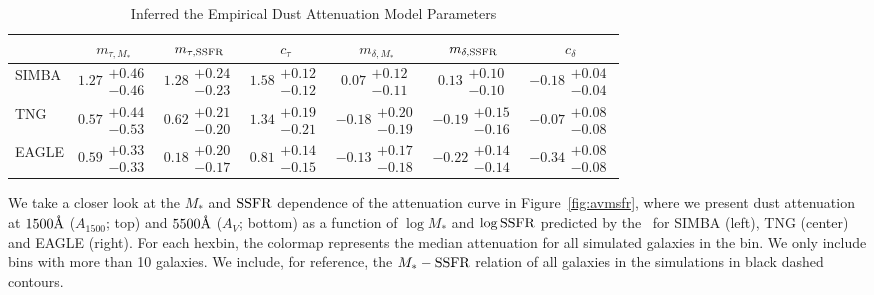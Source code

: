 \begin{table}
    \caption{Inferred the Empirical Dust Attenuation Model Parameters}
    \begin{tabular}{lcccccc} \toprule
        & $m_{\tau,M_*}$ & $m_{\tau,{\rm SSFR}}$ & $c_\tau$ & $m_{\delta,M_*}$ & $m_{\delta,{\rm SSFR}}$ & $c_\delta$ \\[3pt] \hline\hline
        SIMBA   & $1.27\substack{+0.46\\-0.46}$ &
        $1.28\substack{+0.24\\-0.23}$ & $1.58\substack{+0.12\\-0.12}$ &
        $0.07 \substack{+0.12\\-0.11}$ & $0.13 \substack{+0.10\\-0.10}$ &
        $-0.18\substack{+0.04\\-0.04}$ \\
        TNG     & $0.57\substack{+0.44\\-0.53}$ &
        $0.62\substack{+0.21\\-0.20}$ & $1.34\substack{+0.19\\-0.21}$ &
        $-0.18\substack{+0.20\\-0.19}$ & $-0.19\substack{+0.15\\-0.16}$ &
        $-0.07\substack{+0.08\\-0.08}$ \\
        EAGLE   & $0.59\substack{+0.33\\-0.33}$ &
        $0.18\substack{+0.20\\-0.17}$ & $0.81\substack{+0.14\\-0.15}$ &
        $-0.13\substack{+0.17\\-0.18}$ & $-0.22\substack{+0.14\\-0.14}$ &
        $-0.34\substack{+0.08\\-0.08}$\\
        \hline
    \end{tabular} \label{tab:posterior}
\end{table}

We take a closer look at the $M_*$ and ${\rm SSFR}$ dependence of the attenuation
curve in Figure~\ref{fig:avmsfr}, where we present dust attenuation at
$1500\AA$ ($A_{1500}$; top) and $5500\AA$
($A_V$; bottom) as a function of $\log M_*$ and $\log {\rm SSFR}$ predicted by the
\eda~for SIMBA (left), TNG (center) and EAGLE (right). 
For each hexbin, the colormap represents the median attenuation for all
simulated galaxies in the bin. 
We only include bins with more than 10 galaxies. 
We include, for reference, the $M_* - {\rm SSFR}$ relation of all galaxies in the
simulations in black dashed contours.

